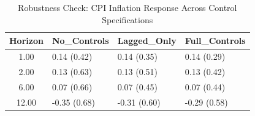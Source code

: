 \begin{table}[ht]
\centering
\caption{Robustness Check: CPI Inflation Response Across Control Specifications} 
\label{tab:robust_controls_cpi}
\begin{tabular}{clll}
  \toprule
Horizon & No_Controls & Lagged_Only & Full_Controls \\ 
  \midrule
1.00 & 0.14 (0.42) & 0.14 (0.35) & 0.14 (0.29) \\ 
  2.00 & 0.13 (0.63) & 0.13 (0.51) & 0.13 (0.42) \\ 
  6.00 & 0.07 (0.66) & 0.07 (0.45) & 0.07 (0.44) \\ 
  12.00 & -0.35 (0.68) & -0.31 (0.60) & -0.29 (0.58) \\ 
   \bottomrule
\end{tabular}
\end{table}
